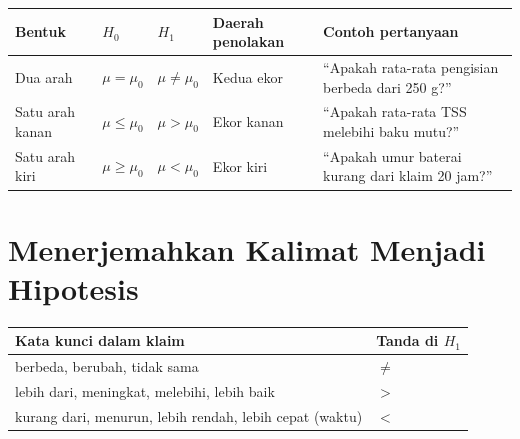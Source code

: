 \documentclass[
  indonesian,
  letterpaper,
]{book}
\newcounter{none} %
\begin{document}
{\def\LTcaptype{none} %
\begin{longtable}[]{@{}
  >{\raggedright\arraybackslash}p{}
  >{\raggedright\arraybackslash}p{}
  >{\raggedright\arraybackslash}p{}
  >{\raggedright\arraybackslash}p{}
  >{\raggedright\arraybackslash}p{}@{}}
\toprule\noalign{}
\begin{minipage}[b]{\linewidth}\raggedright
Bentuk
\end{minipage} & \begin{minipage}[b]{\linewidth}\raggedright
\(H_0\)
\end{minipage} & \begin{minipage}[b]{\linewidth}\raggedright
\(H_1\)
\end{minipage} & \begin{minipage}[b]{\linewidth}\raggedright
Daerah penolakan
\end{minipage} & \begin{minipage}[b]{\linewidth}\raggedright
Contoh pertanyaan
\end{minipage} \\
\midrule\noalign{}
\endhead
\bottomrule\noalign{}
\endlastfoot
Dua arah & \(\mu = \mu_0\) & \(\mu \ne \mu_0\) & Kedua ekor & ``Apakah
rata-rata pengisian berbeda dari 250 g?'' \\
Satu arah kanan & \(\mu \le \mu_0\) & \(\mu > \mu_0\) & Ekor kanan &
``Apakah rata-rata TSS melebihi baku mutu?'' \\
Satu arah kiri & \(\mu \ge \mu_0\) & \(\mu < \mu_0\) & Ekor kiri &
``Apakah umur baterai kurang dari klaim 20 jam?'' \\
\end{longtable}
}

\section{Menerjemahkan Kalimat Menjadi
Hipotesis}\label{menerjemahkan-kalimat-menjadi-hipotesis}

{\def\LTcaptype{none} %
\begin{longtable}[]{@{}ll@{}}
\toprule\noalign{}
Kata kunci dalam klaim & Tanda di \(H_1\) \\
\midrule\noalign{}
\endhead
\bottomrule\noalign{}
\endlastfoot
berbeda, berubah, tidak sama & \(\ne\) \\
lebih dari, meningkat, melebihi, lebih baik & \(>\) \\
kurang dari, menurun, lebih rendah, lebih cepat (waktu) & \(<\) \\
\end{longtable}
}
\end{document}
